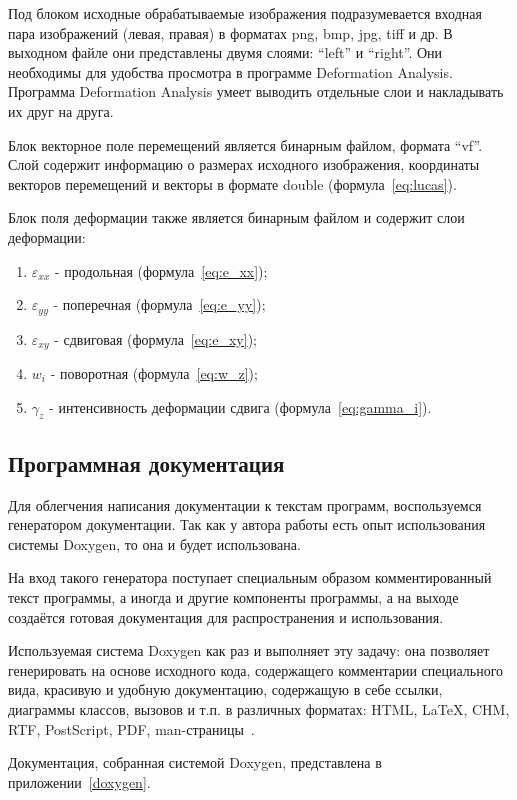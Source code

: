 Под блоком исходные обрабатываемые изображения подразумевается входная пара изображений (левая, правая) в форматах png, bmp, jpg, tiff и др. В выходном файле они представлены двумя слоями: ``left'' и ``right''. Они необходимы для удобства просмотра в программе Deformation Analysis. Программа Deformation Analysis умеет выводить отдельные слои и накладывать их друг на друга.

Блок векторное поле перемещений является бинарным файлом, формата ``vf''. Слой содержит информацию о размерах исходного изображения, координаты векторов перемещений и векторы в формате double (формула~\ref{eq:lucas}).

Блок поля деформации также является бинарным файлом и содержит слои деформации:
\begin{enumerate}
\item $\varepsilon_{xx}$ - продольная (формула~\ref{eq:e_xx});
\item $\varepsilon_{yy}$ - поперечная (формула~\ref{eq:e_yy});
\item $\varepsilon_{xy}$ - сдвиговая (формула~\ref{eq:e_xy});
\item $w_{i}$ - поворотная (формула~\ref{eq:w_z});
\item $\gamma_z$ - интенсивность деформации сдвига (формула~\ref{eq:gamma_i}).
\end{enumerate}

\subsection{Программная документация}
Для облегчения написания документации к текстам программ, воспользуемся генератором документации. Так как у автора работы есть опыт использования системы Doxygen, то она и будет использована.

На вход такого генератора поступает специальным образом комментированный текст программы, а иногда и другие компоненты программы, а на выходе создаётся готовая документация для распространения и использования.

Используемая система Doxygen как раз и выполняет эту задачу: она позволяет генерировать на основе исходного кода, содержащего комментарии специального вида, красивую и удобную документацию, содержащую в себе ссылки, диаграммы классов, вызовов и т.п. в различных форматах: HTML, LaTeX, CHM, RTF, PostScript, PDF, man-страницы~\cite{doxygen}.

Документация, собранная системой Doxygen, представлена в приложении~\ref{doxygen}.
